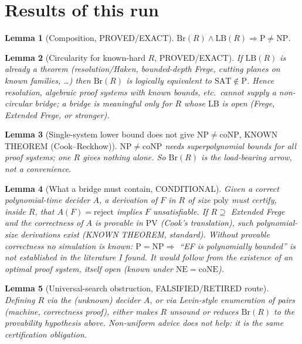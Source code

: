 \documentclass{article}\usepackage{amsmath,amssymb,amsthm}
\newtheorem{lemma}{Lemma}
\begin{document}
\section*{Results of this run}
\begin{lemma}[Composition, PROVED/EXACT]
$\mathrm{Br}(R)\wedge\mathrm{LB}(R)\Rightarrow \mathrm P\ne\mathrm{NP}$.
\end{lemma}
\begin{lemma}[Circularity for known-hard $R$, PROVED/EXACT]
If $\mathrm{LB}(R)$ is already a theorem (resolution/Haken, bounded-depth Frege, cutting planes on known families, \dots) then $\mathrm{Br}(R)$ is logically equivalent to $\mathrm{SAT}\notin\mathrm P$. Hence resolution, algebraic proof systems with known bounds, etc.\ cannot supply a non-circular bridge; a bridge is meaningful only for $R$ whose $\mathrm{LB}$ is open (Frege, Extended Frege, or stronger).
\end{lemma}
\begin{lemma}[Single-system lower bound does not give $\mathrm{NP}\ne\mathrm{coNP}$, KNOWN THEOREM (Cook--Reckhow)]
$\mathrm{NP}\ne\mathrm{coNP}$ needs superpolynomial bounds for \emph{all} proof systems; one $R$ gives nothing alone. So $\mathrm{Br}(R)$ is the load-bearing arrow, not a convenience.
\end{lemma}
\begin{lemma}[What a bridge must contain, CONDITIONAL]
Given a correct polynomial-time decider $A$, a derivation of $F$ in $R$ of size $\mathrm{poly}$ must certify, inside $R$, that $A(F)=\mathrm{reject}$ implies $F$ unsatisfiable. If $R\supseteq$ Extended Frege and the correctness of $A$ is provable in $\mathrm{PV}$ (Cook's translation), such polynomial-size derivations exist (KNOWN THEOREM, standard). Without provable correctness no simulation is known: $\mathrm P=\mathrm{NP}\Rightarrow$ ``EF is polynomially bounded'' is not established in the literature I found. It would follow from the existence of an optimal proof system, itself open (known under $\mathrm{NE}=\mathrm{coNE}$).
\end{lemma}
\begin{lemma}[Universal-search obstruction, FALSIFIED/RETIRED route]
Defining $R$ via the (unknown) decider $A$, or via Levin-style enumeration of pairs (machine, correctness proof), either makes $R$ unsound or reduces $\mathrm{Br}(R)$ to the provability hypothesis above. Non-uniform advice does not help: it is the same certification obligation.
\end{lemma}
\end{document}
